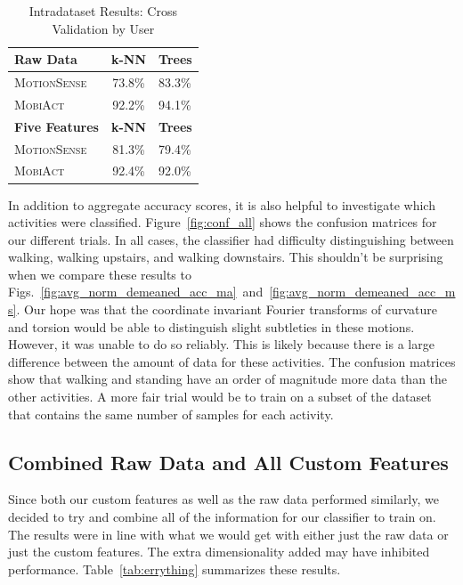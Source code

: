 \begin{table}[ht]
\centering
\caption{Intradataset Results: Cross Validation by User}
\begin{tabular}{lcl}
\toprule
\multicolumn{1}{l}{\textbf{Raw Data}} & \multicolumn{1}{c}{\textbf{k-NN}} & \multicolumn{1}{c}{\textbf{Trees}}  \\ \midrule
\textsc{MotionSense} & 73.8\% & 83.3\% \\
\textsc{MobiAct}     & 92.2\% & 94.1\% \\
\toprule
\multicolumn{1}{l}{\textbf{Five Features}} & \multicolumn{1}{c}{\textbf{k-NN}} & \multicolumn{1}{c}{\textbf{Trees}}  \\ \midrule
\textsc{MotionSense} & 81.3\% & 79.4\% \\
\textsc{MobiAct}     & 92.4\% & 92.0\% \\
\bottomrule
\end{tabular}
\label{tab:ms_ms_user_5}
\end{table}



In addition to aggregate accuracy scores, it is also helpful to investigate which activities were classified. Figure~\ref{fig:conf_all} shows the confusion matrices for our different trials. In all cases, the classifier had difficulty distinguishing between walking, walking upstairs, and walking downstairs. This shouldn't be surprising when we compare these results to Figs.~\ref{fig:avg_norm_demeaned_acc_ma}~and~\ref{fig:avg_norm_demeaned_acc_ms}. Our hope was that the coordinate invariant Fourier transforms of curvature and torsion would be able to distinguish slight subtleties in these motions. However, it was unable to do so reliably. This is likely because there is a large difference between the amount of data for these activities. The confusion matrices show that walking and standing have an order of magnitude more data than the other activities. A more fair trial would be to train on a subset of the dataset that contains the same number of samples for each activity.

\subsection{Combined Raw Data and All Custom Features}

Since both our custom features as well as the raw data performed similarly, we decided to try and combine all of the information for our classifier to train on. The results were in line with what we would get with either just the raw data or just the custom features. The extra dimensionality added may have inhibited performance.  Table~\ref{tab:errything} summarizes these results.

